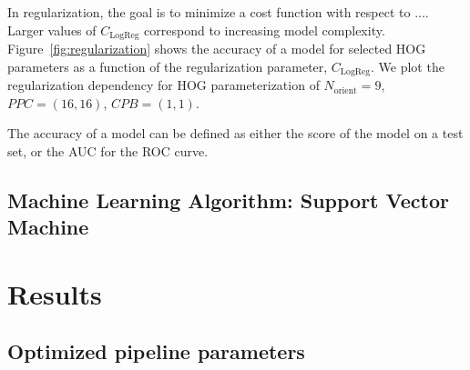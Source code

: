 \documentclass{emulateapj}
\begin{document}
In regularization, the goal is to minimize a cost function with
respect to ....  Larger values of $C_\text{LogReg}$ correspond to
increasing model complexity.  Figure~\ref{fig:regularization} shows
the accuracy of a model for selected HOG parameters as a function of
the regularization parameter, $C_\text{LogReg}$.  We plot the
regularization dependency for HOG parameterization of
$N_\text{orient}=9$, $PPC=(16, 16)$, $CPB=(1,1)$.  

The accuracy of a model can be defined as either the score of the
model on a test set, or the AUC for the ROC curve.



\subsection{Machine Learning Algorithm: Support Vector Machine}



\section{Results}
\label{sec:results}
\subsection{Optimized pipeline parameters}\label{sec:gridsearch}
\end{document}
